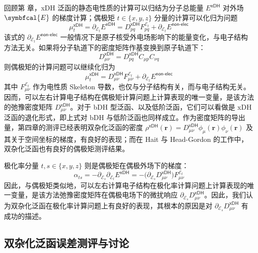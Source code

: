 回顾第  章，xDH 泛函的静态电性质的计算可以归结为分子总能量 $E^\textsf{xDH}$ 对外场 $\symbfcal{E}$ 的梯度计算；偶极矩 $t \in \{ x, y, z \}$ 分量的计算可以化归为问题
\begin{equation*}
    \mu_t^\textsf{xDH} = \partial_{\mathcal{E}_t} E^\textsf{xDH} = D_{pq}^\textsf{xDH} F_{pq}^{\mathcal{E}_t} + \partial_{\mathcal{E}_t} E^\textsf{non-elec}
\end{equation*}
该式的 $\partial_{\mathcal{E}_t} E^\textsf{non-elec}$ 一般情况下是原子核受外电场影响下的能量变化，与电子结构方法无关。如果将分子轨道下的密度矩阵作基变换到原子轨道下：
\begin{equation*}
    D_{\mu \nu}^\textsf{xDH} = D_{pq}^\textsf{xDH} C_{\mu p} C_{\nu q}
\end{equation*}
则偶极矩的计算问题可以继续化归为
\begin{equation}
    \mu_t^\textsf{xDH} = D_{\mu \nu}^\textsf{xDH} F_{\mu \nu}^{\mathcal{E}_t} + \partial_{\mathcal{E}_t} E^\textsf{non-elec}
\end{equation}
其中 $F_{\mu \nu}^{\mathcal{E}_t}$ 作为电性质 Skeleton 导数，也仅与分子结构有关，而与电子结构无关。因而，可以左右计算电子结构在偶极矩计算问题上计算表现的唯一变量，是该方法的弛豫密度矩阵 $D_{\mu \nu}^\textsf{xDH}$。对于 bDH 型泛函、以及低阶泛函，它们可以看做是 xDH 泛函的退化形式，即上式对 bDH 与低阶泛函也同样成立。作为密度矩阵的导出量，第四章的测评已经表明双杂化泛函的密度 $\rho^\textsf{xDH} (\bm{r}) = D_{\mu \nu}^\textsf{xDH} \phi_\mu (\bm{r}) \phi_\nu (\bm{r})$ 及其关于空间坐标的梯度，有良好的表现；而在 Hait 与 Head-Gordon 的工作\cite{Hait-Head-Gordon.JCTC.2018}中，双杂化泛函也有良好的偶极矩测评结果。

极化率分量 $t, s \in \{ x, y, z \}$ 则是偶极矩在偶极外场下的梯度：
\begin{equation*}
    \alpha_{ts} = - \partial_{\mathcal{E}_s} \partial_{\mathcal{E}_t} E^\textsf{xDH} = - \big( \partial_{\mathcal{E}_s} D_{\mu \nu}^\textsf{xDH} \big) F_{\mu \nu}^{\mathcal{E}_t}
\end{equation*}
因此，与偶极矩类似地，可以左右计算电子结构在极化率计算问题上计算表现的唯一变量，是该方法弛豫密度矩阵在偶极电场下的微扰响应 $\partial_{\mathcal{E}_s} D_{\mu \nu}^\textsf{xDH}$。因此，我们认为双杂化泛函在极化率计算问题上有良好的表现，其根本的原因是对 $\partial_{\mathcal{E}_s} D_{\mu \nu}^\textsf{xDH}$ 有成功的描述。

\subsection{双杂化泛函误差测评与讨论}

